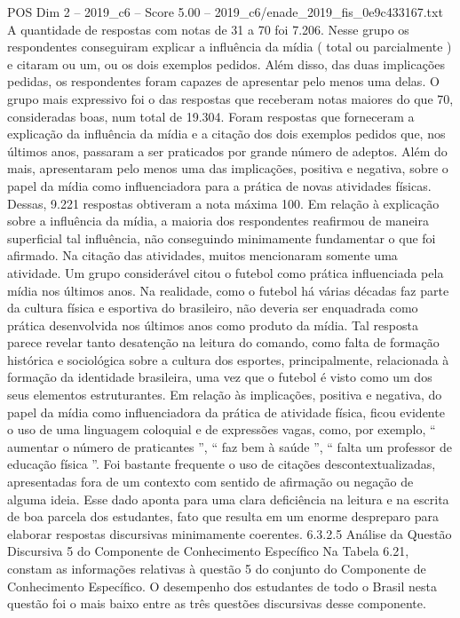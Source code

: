 \begin{textsample}{POS Dim 2 – 2019\_c6 – Score 5.00 – 2019\_c6/enade\_2019\_fis\_0e9c433167.txt}
A quantidade de respostas com notas de 31 a 70 foi 7.206.
Nesse grupo os respondentes conseguiram explicar a influência da mídia ( total ou parcialmente ) e citaram ou um, ou os dois exemplos pedidos.
Além disso, das duas implicações pedidas, os respondentes foram capazes de apresentar pelo menos uma delas.
O grupo mais expressivo foi o das respostas que receberam notas maiores do que 70, consideradas boas, num total de 19.304.
Foram respostas que forneceram a explicação da influência da mídia e a citação dos dois exemplos pedidos que, nos últimos anos, passaram a ser praticados por grande número de adeptos.
Além do mais, apresentaram pelo menos uma das implicações, positiva e negativa, sobre o papel da mídia como influenciadora para a prática de novas atividades físicas.
Dessas, 9.221 respostas obtiveram a nota máxima 100.
Em relação à explicação sobre a influência da mídia, a maioria dos respondentes reafirmou de maneira superficial tal influência, não conseguindo minimamente fundamentar o que foi afirmado.
Na citação das atividades, muitos mencionaram somente uma atividade.
Um grupo considerável citou o futebol como prática influenciada pela mídia nos últimos anos.
Na realidade, como o futebol há várias décadas faz parte da cultura física e esportiva do brasileiro, não deveria ser enquadrada como prática desenvolvida nos últimos anos como produto da mídia.
Tal resposta parece revelar tanto desatenção na leitura do comando, como falta de formação histórica e sociológica sobre a cultura dos esportes, principalmente, relacionada à formação da identidade brasileira, uma vez que o futebol é visto como um dos seus elementos estruturantes.
Em relação às implicações, positiva e negativa, do papel da mídia como influenciadora da prática de atividade física, ficou evidente o uso de uma linguagem coloquial e de expressões vagas, como, por exemplo, “ aumentar o número de praticantes ”, “ faz bem à saúde ”, “ falta um professor de educação física ”.
Foi bastante frequente o uso de citações descontextualizadas, apresentadas fora de um contexto com sentido de afirmação ou negação de alguma ideia.
Esse dado aponta para uma clara deficiência na leitura e na escrita de boa parcela dos estudantes, fato que resulta em um enorme despreparo para elaborar respostas discursivas minimamente coerentes. 6.3.2.5 Análise da Questão Discursiva 5 do Componente de Conhecimento Específico Na Tabela 6.21, constam as informações relativas à questão 5 do conjunto do Componente de Conhecimento Específico.
O desempenho dos estudantes de todo o Brasil nesta questão foi o mais baixo entre as três questões discursivas desse componente.

\end{textsample}
